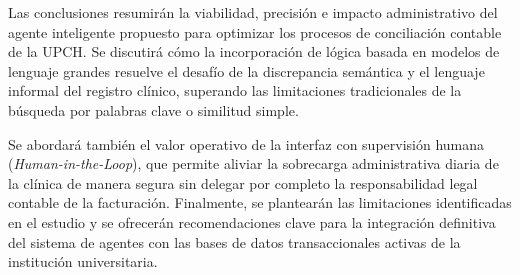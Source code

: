 \label{ch:conclusiones}
Las conclusiones resumirán la viabilidad, precisión e impacto administrativo del agente inteligente propuesto para optimizar los procesos de conciliación contable de la UPCH. Se discutirá cómo la incorporación de lógica basada en modelos de lenguaje grandes resuelve el desafío de la discrepancia semántica y el lenguaje informal del registro clínico, superando las limitaciones tradicionales de la búsqueda por palabras clave o similitud simple.

Se abordará también el valor operativo de la interfaz con supervisión humana (\textit{Human-in-the-Loop}), que permite aliviar la sobrecarga administrativa diaria de la clínica de manera segura sin delegar por completo la responsabilidad legal contable de la facturación. Finalmente, se plantearán las limitaciones identificadas en el estudio y se ofrecerán recomendaciones clave para la integración definitiva del sistema de agentes con las bases de datos transaccionales activas de la institución universitaria.

